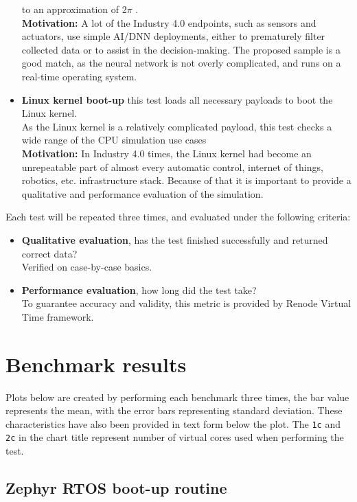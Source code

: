 \begin{itemize}
{    to an approximation of 2$\pi$ \cite{ZephyrTF}.\\
    \textbf{Motivation:} A lot of the Industry 4.0 endpoints, such as sensors and actuators, use simple AI/DNN
    deployments, either to prematurely filter collected data or to assist in the decision-making. The proposed sample
    is a good match, as the neural network is not overly complicated, and runs on a real-time operating system.}
    \item{\textbf{Linux kernel boot-up} this test loads all necessary payloads to boot the Linux kernel.\\
    As the Linux kernel is a relatively complicated payload, this test checks a wide range of the CPU simulation use
    cases\\
    \textbf{Motivation:} In Industry 4.0 times, the Linux kernel had become an unrepeatable part of almost every
    automatic control, internet of things, robotics, etc. infrastructure stack. Because of that it is important to
    provide a qualitative and performance evaluation of the simulation.}
\end{itemize}

\noindent
Each test will be repeated three times, and evaluated under the following criteria:
\begin{itemize}
    \item{\textbf{Qualitative evaluation}, has the test finished successfully and returned correct data?\\
    Verified on case-by-case basics.}
    \item{\textbf{Performance evaluation}, how long did the test take?\\To guarantee accuracy and validity, this metric is
     provided by Renode Virtual Time framework.}
\end{itemize}

\pagebreak

\section{Benchmark results}

Plots below are created by performing each benchmark three times, the bar value represents the mean, with the error bars
representing standard deviation. These characteristics have also been provided in text form below the plot. The
\texttt{1c} and \texttt{2c} in the chart title represent number of virtual cores used when performing the test.

\subsection{Zephyr RTOS boot-up routine}

